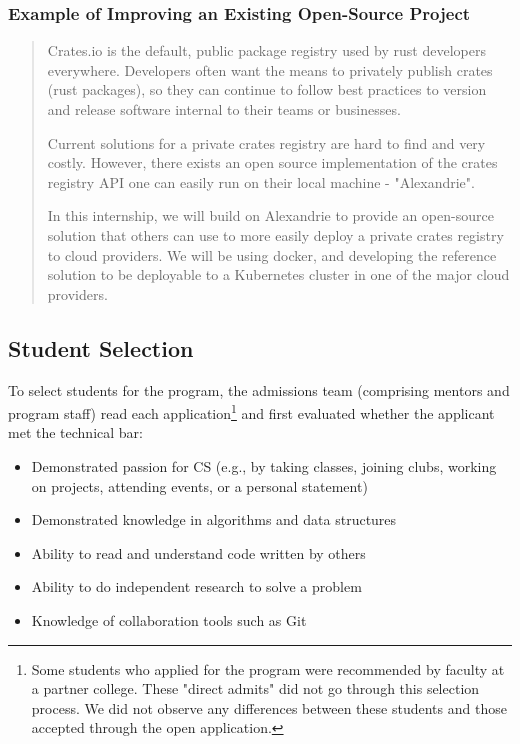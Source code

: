 \subsubsection{Example of Improving an Existing Open-Source Project}
\begin{quote}
Crates.io is the default, public package registry used by rust developers everywhere. Developers often want the means to privately publish crates (rust packages), so they can continue to follow best practices to version and release software internal to their teams or businesses.

Current solutions for a private crates registry are hard to find and very costly. However, there exists an open source implementation of the crates registry API one can easily run on their local machine - "Alexandrie".

In this internship, we will build on Alexandrie to provide an open-source solution that others can use to more easily deploy a private crates registry to cloud providers. We will be using docker, and developing the reference solution to be deployable to a Kubernetes cluster in one of the major cloud providers.
\end{quote}


\subsection{Student Selection}

To select students for the program, the admissions team (comprising mentors and program staff) read each application\footnote{Some students who applied for the program were recommended by faculty at a partner college. These "direct admits" did not go through this selection process. We did not observe any differences between these students and those accepted through the open application.} and first evaluated whether the applicant met the technical bar:

\begin{itemize}
    \item Demonstrated passion for CS (e.g., by taking classes, joining clubs, working on projects, attending events, or a personal statement)
    \item Demonstrated knowledge in algorithms and data structures
    \item Ability to read and understand code written by others
    \item Ability to do independent research to solve a problem
    \item Knowledge of collaboration tools such as Git
\end{itemize}

